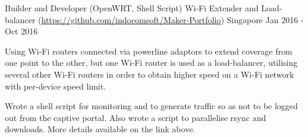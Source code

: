 \begin{cventries}
\cventry
    {Builder and Developer (OpenWRT, Shell Script)} %
    {Wi-Fi Extender and Load-balancer (\url{https://github.com/indocomsoft/Maker-Portfolio})} %
    {Singapore} %
    {Jan 2016 - Oct 2016} %
    {
      \begin{cvitems} %
      	\item {Using Wi-Fi routers connected via powerline adaptors to extend coverage from one point to the other, but one Wi-Fi router is used as a load-balancer, utilising several other Wi-Fi routers in order to obtain higher speed on a Wi-Fi network with per-device speed limit.}
      	\item {Wrote a shell script for monitoring and to generate traffic so as not to be logged out from the captive portal. Also wrote a script to parallelise rsync and downloads. More details available on the link above.}
      \end{cvitems}
    }
\end{cventries}
